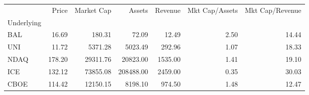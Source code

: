 \begin{tabular}{lrrrrrr}
\toprule
{} &   Price &  Market Cap &     Assets &  Revenue &  Mkt Cap/Assets &  Mkt Cap/Revenue \\
Underlying &         &             &            &          &                 &                  \\
\midrule
BAL        &   16.69 &      180.31 &      72.09 &    12.49 &            2.50 &            14.44 \\
UNI        &   11.72 &     5371.28 &    5023.49 &   292.96 &            1.07 &            18.33 \\
NDAQ       &  178.20 &    29311.76 &   20823.00 &  1535.00 &            1.41 &            19.10 \\
ICE        &  132.12 &    73855.08 &  208488.00 &  2459.00 &            0.35 &            30.03 \\
CBOE       &  114.42 &    12150.15 &    8198.10 &   974.50 &            1.48 &            12.47 \\
\bottomrule
\end{tabular}
